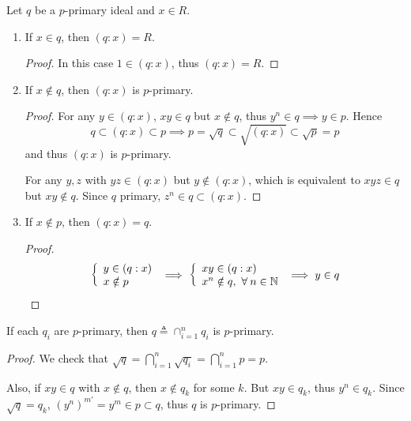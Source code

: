 \begin{prop} \label{prop:primary-divide-by-element}
  Let $q$ be a $p$-primary ideal and $x \in R$.
  \begin{enumerate}
    \item If $x \in q$, then $(q: x) = R$.
      \begin{proof}
        In this case $1 \in (q: x)$, thus $(q: x) = R$.
      \end{proof}
    \item If $x \notin q$, then $(q: x)$ is $p$-primary.
      \begin{proof}
        For any $y \in (q: x)$, $xy \in q$ but $x \notin q$, thus $y^n \in q \implies y \in p$.
        Hence
        \[ q \subset (q: x) \subset p \implies p = \sqrt{q} \subset \sqrt{(q: x)} \subset \sqrt{p} = p \]
        and thus $(q: x)$ is $p$-primary.

        For any $y, z$ with $yz \in (q: x)$ but $y \notin (q: x)$, which is equivalent
        to $xyz \in q$ but $xy \notin q$. Since $q$ primary, $z^n \in q \subset (q: x)$.
      \end{proof}
    \item If $x \notin p$, then $(q: x) = q$.
      \begin{proof}
        \[
          \left\{ \begin{array}{l}
            y \in (q: x) \\
            x \notin p \\
          \end{array} \right. \implies
          \left\{ \begin{array}{l}
            xy \in (q: x) \\
            x^n \notin q, \ \forall n \in \Nb \\
          \end{array} \right. \implies y \in q
          \qedhere
        \]
      \end{proof}
  \end{enumerate}
\end{prop}

\begin{prop}  \label{prop:intersection-of-primary-is-primary}
  If each $q_i$ are $p$-primary, then $q \triangleq \cap_{i = 1}^n q_i$ is $p$-primary.

  \begin{proof}
    We check that $\sqrt{q} = \bigcap_{i = 1}^n \sqrt{q_i} = \bigcap_{i = 1}^n p = p$.

    Also, if $xy \in q$ with $x \notin q$, then $x \notin q_k$ for some $k$.
    But $xy \in q_k$, thus $y^n \in q_k$. Since $\sqrt{q} = q_k$, $(y^n)^{m'} = y^m \in p \subset q$,
    thus $q$ is $p$-primary.
  \end{proof}
\end{prop}

